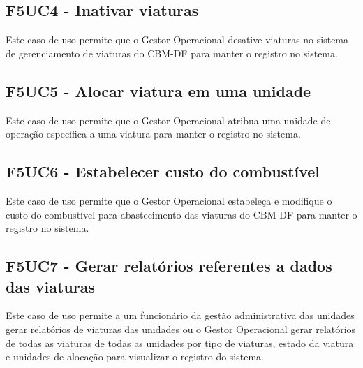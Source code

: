   \subsection{F5UC4 - Inativar viaturas}
Este caso de uso permite que o Gestor Operacional desative viaturas no sistema de gerenciamento de viaturas do CBM-DF para manter o registro no sistema.
  \subsection{F5UC5 - Alocar viatura em uma unidade}
Este caso de uso permite que o Gestor Operacional atribua uma unidade de operação específica a uma viatura para manter o registro no sistema.
  \subsection{F5UC6 - Estabelecer custo do combustível}
Este caso de uso permite que o Gestor Operacional estabeleça e modifique o custo do combustível para abastecimento das viaturas do CBM-DF para manter o registro no sistema.
  \subsection{F5UC7 - Gerar relatórios referentes a dados das viaturas}
Este caso de uso permite a um funcionário da gestão administrativa das unidades gerar relatórios de viaturas das unidades ou o Gestor Operacional gerar relatórios de todas as viaturas de todas as unidades por tipo de viaturas, estado da viatura e unidades de alocação para visualizar o registro do sistema.
